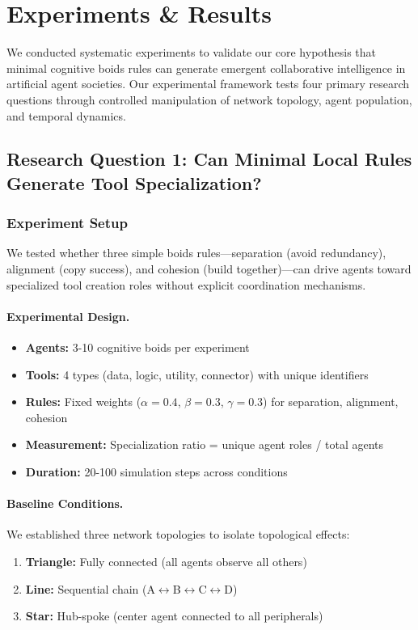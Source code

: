 \section{Experiments \& Results}

We conducted systematic experiments to validate our core hypothesis that minimal cognitive boids rules can generate emergent collaborative intelligence in artificial agent societies. Our experimental framework tests four primary research questions through controlled manipulation of network topology, agent population, and temporal dynamics.

\subsection{Research Question 1: Can Minimal Local Rules Generate Tool Specialization?}

\subsubsection{Experiment Setup}
We tested whether three simple boids rules---separation (avoid redundancy), alignment (copy success), and cohesion (build together)---can drive agents toward specialized tool creation roles without explicit coordination mechanisms.

\paragraph{Experimental Design.}
\begin{itemize}
    \item \textbf{Agents:} 3-10 cognitive boids per experiment
    \item \textbf{Tools:} 4 types (data, logic, utility, connector) with unique identifiers
    \item \textbf{Rules:} Fixed weights ($\alpha=0.4$, $\beta=0.3$, $\gamma=0.3$) for separation, alignment, cohesion
    \item \textbf{Measurement:} Specialization ratio = unique agent roles / total agents
    \item \textbf{Duration:} 20-100 simulation steps across conditions
\end{itemize}

\paragraph{Baseline Conditions.}
We established three network topologies to isolate topological effects:
\begin{enumerate}
    \item \textbf{Triangle:} Fully connected (all agents observe all others)
    \item \textbf{Line:} Sequential chain (A$\leftrightarrow$B$\leftrightarrow$C$\leftrightarrow$D)
    \item \textbf{Star:} Hub-spoke (center agent connected to all peripherals)
\end{enumerate}

